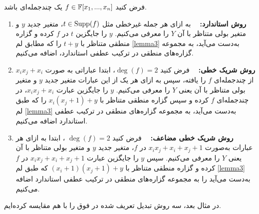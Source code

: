 \begin{definition}
فرض کنید 
$f\in\mathbb{F}[x_{1},...,x_{n}]$
یک چندجمله‌ای باشد. 
\begin{enumerate}
\item
\textbf{روش استاندارد: \ }
به ازای هر جمله غیرخطی مثل 
$t\in\operatorname{\mathrm{Supp}}(f)$، 
 متغیر جدید 
$y$
و متغیر بولی متناظر با آن 
$Y$
را معرفی می‌کنیم. 
$y$
را جایگزین 
$t$
در 
$f$
کرده و گزاره منطقی متناظر با 
$t+y$
را که مطابق لم 
\ref{lemma3}
به‌دست می‌آید،  به مجموعه گزاره‌های منطقی در ترکیب عطفی استاندارد، اضافه می‌کنیم. 
\item
\textbf{روش شریک خطی:  \ }
فرض کنید 
$\deg(f) = 2$، 
ابتدا عباراتی به صورت 
$x_{i}x_{j} + x_{i}$
از چندجمله‌ای 
$f$
را یافته، سپس به ازای هر یک از این عبارات متغیر جدید 
$y$
و متغیر بولی متناظر با آن یعنی 
$Y$
را معرفی می‌کنیم. 
$y$
را جایگزین عبارت 
$x_{i}x_{j} + x_{i}$، 
در چندجمله‌ای 
$f$
کرده و سپس گزاره منطقی متناظر با 
$x_{i}(x_{j} + 1) + y$
 را که طبق لم 
\ref{lemma3}
به‌دست می‌آید، به مجموعه‌ گزاره‌های منطقی در ترکیب عطفی استاندارد اضافه می‌کنیم. 
\item 
\textbf{روش شریک خطی مضاعف: \ }
فرض کنید 
$\deg(f) = 2$
، ابتدا به ازای هر عبارات به‌صورت 
$x_{i}x_{j} + x_{i} + x_{j} + 1$
در 
$f$، 
متغیر جدید 
$y$
و متغیر بولی متناظر با آن یعنی 
$Y$
را معرفی می‌کنیم. سپس 
$y$
را جایگزین عبارت 
$x_{i}x_{j} + x_{i} + x_{j} + 1$
در 
$f$
کرده و گزاره منطقی متناظر با 
$(x_{i} + 1)(x_{j} + 1) + y$
که طبق لم 
\ref{lemma3}
به‌دست می‌آید را به مجموعه   گزاره‌های منطقی در ترکیب عطفی استاندارد اضافه می‌کنیم. 
\end{enumerate}
\end{definition}
در مثال بعد،  سه روش تبدیل تعریف شده در  فوق را با هم مقایسه کرده‌ایم. 
